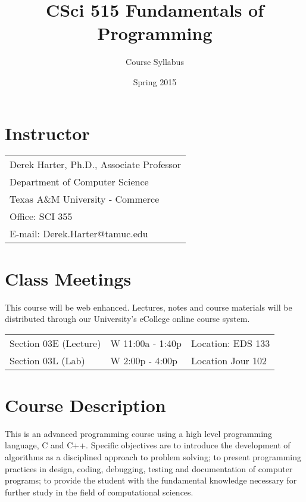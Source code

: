 \documentclass[11pt]{article}
\title{CSci 515 Fundamentals of Programming}
\author{Course Syllabus}
\date{Spring 2015}
\begin{document}
\maketitle


\section*{Instructor}
\label{sec-1}



\begin{center}
\begin{tabular*}{0.9\textwidth}{l}
 Derek Harter, Ph.D., Associate Professor  \\
 Department of Computer Science            \\
 Texas A\&M University - Commerce          \\
 Office: SCI 355                           \\
 E-mail: Derek.Harter@tamuc.edu            \\
\end{tabular*}
\end{center}
\section*{Class Meetings}
\label{sec-2}


This course will be web enhanced.  Lectures, notes and course
materials will be distributed through our University's eCollege online
course system.


\begin{center}
\begin{tabular*}{0.9\textwidth}{lll}
 Section 03E (Lecture)  &  W 11:00a - 1:40p  &  Location: EDS 133  \\
 Section 03L (Lab)      &  W  2:00p - 4:00p  &  Location Jour 102  \\
\end{tabular*}
\end{center}
\section*{Course Description}
\label{sec-3}

This is an advanced programming course using a high level programming
language, C and C++. Specific objectives are to introduce the
development of algorithms as a disciplined approach to problem
solving; to present programming practices in design, coding,
debugging, testing and documentation of computer programs; to provide
the student with the fundamental knowledge necessary for further study
in the field of computational sciences.
\end{document}
